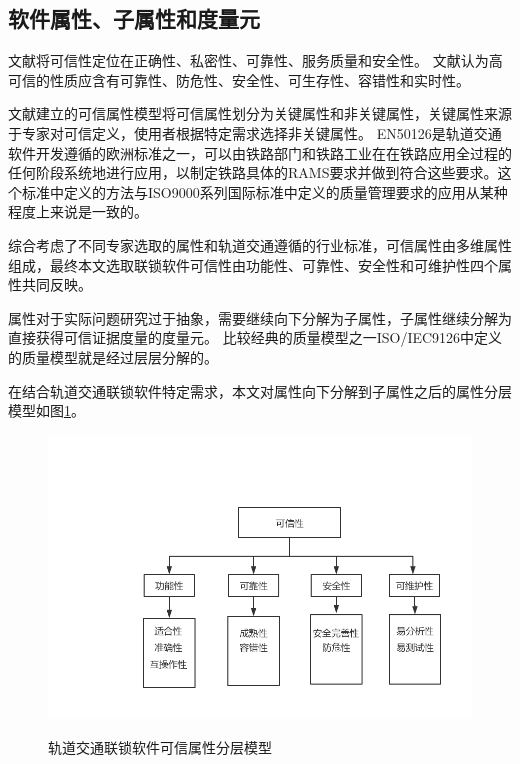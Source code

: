 \subsection{软件属性、子属性和度量元}
文献\cite{Becker2006Trustworthy}将可信性定位在正确性、私密性、可靠性、服务质量和安全性。
文献\cite{陈火旺2003高可信软件工程技术}认为高可信的性质应含有可靠性、防危性、安全性、可生存性、容错性和实时性。

文献\cite{陶红伟2011基于属性的软件可信性度量模型研究}建立的可信属性模型将可信属性划分为关键属性和非关键属性，关键属性来源于专家对可信定义，使用者根据特定需求选择非关键属性。
EN50126\cite{EN50126}是轨道交通软件开发遵循的欧洲标准之一，可以由铁路部门和铁路工业在在铁路应用全过程的任何阶段系统地进行应用，以制定铁路具体的RAMS要求并做到符合这些要求。这个标准中定义的方法与ISO9000系列国际标准中定义的质量管理要求的应用从某种程度上来说是一致的。

综合考虑了不同专家选取的属性和轨道交通遵循的行业标准，可信属性由多维属性组成，最终本文选取联锁软件可信性由功能性、可靠性、安全性和可维护性四个属性共同反映。

属性对于实际问题研究过于抽象，需要继续向下分解为子属性，子属性继续分解为直接获得可信证据度量的度量元\cite{张俊2016一种基于软件属性相互影响和重要性的属性权重分配方法}。
比较经典的质量模型之一ISO/IEC9126\cite{ISO9126-22001,ISO9126-32001}中定义的质量模型就是经过层层分解的。

在结合轨道交通联锁软件特定需求，本文对属性向下分解到子属性之后的属性分层模型如图\ref{fig:2_01}。
\begin{figure}[H]
	\centering
	\includegraphics[width=13cm]{fig/2_01.png}\\
	\caption{轨道交通联锁软件可信属性分层模型}
	\label{fig:2_01}
\end{figure}

